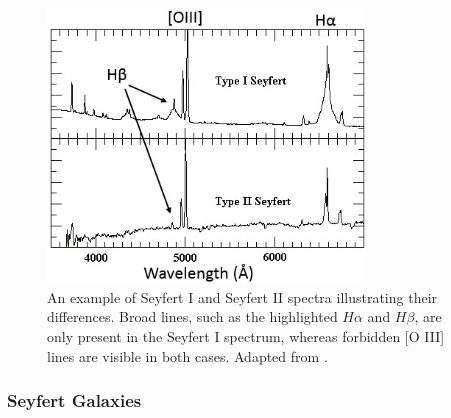 \begin{figure}[!ht]
	\centering
	\includegraphics[width=0.75\textwidth]{pictures/Chapter2/Syefert1vsSeyfer2}
	\caption{An example of Seyfert I and Seyfert II spectra illustrating their differences. Broad lines, such as the highlighted $H\alpha$ and $H\beta$, are only present in the Seyfert I spectrum, whereas forbidden [O III] lines are visible in both cases. Adapted from \parencite{researchgate_seyfert2025}.}
	
	\label{fig:Seyfert1vsSeyfert2}
\end{figure}

\newpage

\subsubsection{Seyfert Galaxies}

